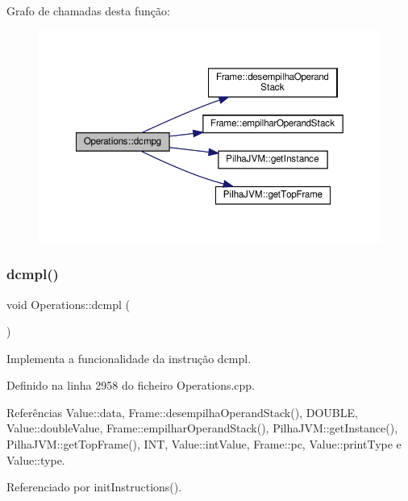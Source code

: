 Grafo de chamadas desta função\+:\nopagebreak
\begin{figure}[H]
\begin{center}
\leavevmode
\includegraphics[width=350pt]{classOperations_a7c2a5194de7a2a59ada752001b8ece0a_cgraph}
\end{center}
\end{figure}
\mbox{\label{classOperations_a89e1792d8c650c2274352c534cfbd7c0}} 
\subsubsection{\texorpdfstring{dcmpl()}{dcmpl()}}
{\footnotesize\ttfamily void Operations\+::dcmpl (\begin{DoxyParamCaption}{ }\end{DoxyParamCaption})\hspace{0.3cm}{\ttfamily [private]}}



Implementa a funcionalidade da instrução dcmpl. 



Definido na linha 2958 do ficheiro Operations.\+cpp.



Referências Value\+::data, Frame\+::desempilha\+Operand\+Stack(), D\+O\+U\+B\+LE, Value\+::double\+Value, Frame\+::empilhar\+Operand\+Stack(), Pilha\+J\+V\+M\+::get\+Instance(), Pilha\+J\+V\+M\+::get\+Top\+Frame(), I\+NT, Value\+::int\+Value, Frame\+::pc, Value\+::print\+Type e Value\+::type.



Referenciado por init\+Instructions().

